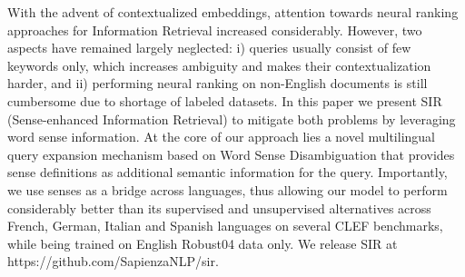 With the advent of contextualized embeddings, attention towards neural ranking approaches for Information Retrieval increased considerably. However, two aspects have remained largely neglected: i) queries usually consist of few keywords only, which increases ambiguity and makes their contextualization harder, and ii) performing neural ranking on non-English documents is still cumbersome due to shortage of labeled datasets. In this paper we present SIR (Sense-enhanced Information Retrieval) to mitigate both problems by leveraging word sense information. At the core of our approach lies a novel multilingual query expansion mechanism based on Word Sense Disambiguation that provides sense definitions as additional semantic information for the query. Importantly, we use senses as a bridge across languages, thus allowing our model to perform considerably better than its supervised and unsupervised alternatives across French, German, Italian and Spanish languages on several CLEF benchmarks, while being trained on English Robust04 data only. We release SIR at https://github.com/SapienzaNLP/sir.
